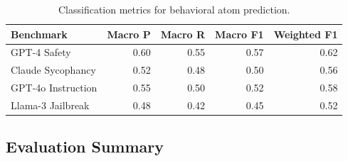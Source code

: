 \documentclass[11pt]{article}
\begin{document}
\begin{table}[t]
\centering
\caption{Classification metrics for behavioral atom prediction.}
\label{tab:f1}
\small
\begin{tabular}{@{}lrrrr@{}}
\toprule
\textbf{Benchmark} & \textbf{Macro P} & \textbf{Macro R} & \textbf{Macro F1} & \textbf{Weighted F1} \\
\midrule
GPT-4 Safety      & 0.60 & 0.55 & 0.57 & 0.62 \\
Claude Sycophancy & 0.52 & 0.48 & 0.50 & 0.56 \\
GPT-4o Instruction & 0.55 & 0.50 & 0.52 & 0.58 \\
Llama-3 Jailbreak & 0.48 & 0.42 & 0.45 & 0.52 \\
\bottomrule
\end{tabular}
\end{table}

\subsection{Evaluation Summary}
\end{document}
